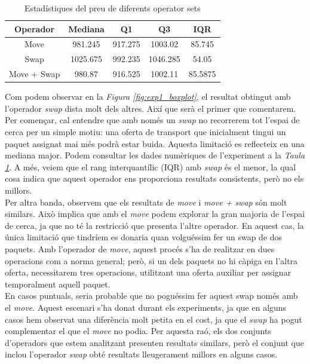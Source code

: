 \documentclass[a4paper]{article}
\begin{document}
	\begin{table}[H]
		\centering
		\begin{tabular}{|c|c|c|c|c|}
			\hline
			\textbf{Operador} & \textbf{Mediana} & \textbf{Q1} & \textbf{Q3} & \textbf{IQR} \\
			\hline
			Move & 981.245 & 917.275 & 1003.02 & 85.745 \\
			\hline
			Swap & 1025.675 & 992.235 & 1046.285 & 54.05 \\
			\hline
			Move + Swap & 980.87 & 916.525 & 1002.11 & 85.5875\\
			\hline
		\end{tabular}
		\caption{Estadístiques del preu de diferents operator sets}
		\label{tab:exp1_estadisticas}
	\end{table}
	
	Com podem observar en la \textit{Figura \ref{fig:exp1_boxplot}}, el resultat obtingut amb l'operador \textit{swap} dista molt dels altres. Així que serà el primer que comentarem. Per començar, cal entendre que amb només un \textit{swap} no recorrerem tot l'espai de cerca per un simple motiu: una oferta de transport que inicialment tingui un paquet assignat mai més podrà estar buida. Aquesta limitació es reflecteix en una mediana major. Podem consultar les dades numèriques de l'experiment a la \textit{Taula \ref{tab:exp1_estadisticas}}. A més, veiem que el rang interquantílic (IQR) amb \textit{swap} és el menor, la qual cosa indica que aquest operador ens proporciona resultats consistents, però no els millors. \\
	
	Per altra banda, observem que els resultats de \textit{move} i \textit{move + swap} són molt similars. Això implica que amb el \textit{move} podem explorar la gran majoria de l'espai de cerca, ja que no té la restricció que presenta l'altre operador. En aquest cas, la única limitació que tindríem es donaria quan volguéssim fer un swap de dos paquets. Amb l'operador de \textit{move}, aquest procés s'ha de realitzar en dues operacions com a norma general; però, si un dels paquets no hi càpiga en l'altra oferta, necessitarem tres operacions, utilitzant una oferta auxiliar per assignar temporalment aquell paquet. \\
	
	En casos puntuals, seria probable que no poguéssim fer aquest swap només amb el \textit{move}. Aquest escenari s'ha donat durant els experiments, ja que en alguns casos hem observat una diferència molt petita en el cost, ja que el \textit{swap} ha pogut complementar el que el \textit{move} no podia. Per aquesta raó, els dos conjunts d'operadors que estem analitzant presenten resultats similars, però el conjunt que inclou l'operador \textit{swap} obté resultats lleugerament millors en alguns casos. \\
	
\end{document}
